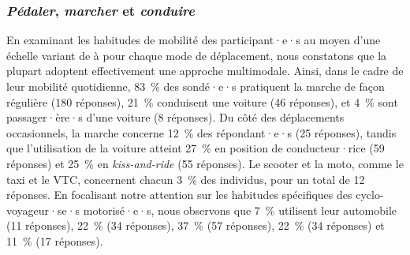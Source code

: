 \begin{refsegment}
\subsubsection*{\textsl{Pédaler}, \textsl{marcher} et \textsl{conduire}
    \label{chap4:capital-mobilite-habitudes}
    }

En examinant les habitudes de mobilité des participant·e·s au moyen d'une échelle variant de  à  pour chaque mode de déplacement, nous constatons que la plupart adoptent effectivement une approche multimodale. Ainsi, dans le cadre de leur mobilité quotidienne, 83~\% des sondé·e·s pratiquent la marche de façon régulière (180 réponses), 21~\% conduisent une voiture (46 réponses), et 4~\% sont passager·ère·s d'une voiture (8 réponses). Du côté des déplacements occasionnels, la marche concerne 12~\% des répondant·e·s (25 réponses), tandis que l'utilisation de la voiture atteint 27~\% en position de conducteur·rice (59 réponses) et 25~\% en \textsl{kiss-and-ride} (55 réponses). Le scooter et la moto, comme le taxi et le \acrshort{VTC}, concernent chacun 3~\% des individus, pour un total de 12 réponses. En focalisant notre attention sur les habitudes spécifiques des cyclo-voyageur·se·s motorisé·e·s, nous observons que 7~\% utilisent  leur automobile (11 réponses), 22~\%  (34 réponses), 37~\%  (57 réponses), 22~\%  (34 réponses) et 11~\%  (17 réponses).%


\end{refsegment}
